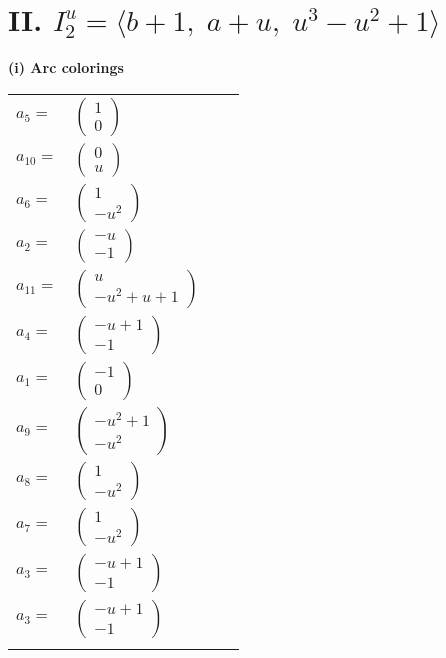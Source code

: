\documentclass[1p]{elsarticle_modified}
\theoremstyle{definition}
\begin{document}
\centering \section*{II. $I^u_{2}= \langle b+1,\;a+u,\;u^3- u^2+1 \rangle$}
\flushleft \textbf{(i) Arc colorings}\\
\begin{tabular}{m{7pt} m{180pt} m{7pt} m{180pt} }
\flushright $a_{5}=$&$\begin{pmatrix}1\\0\end{pmatrix}$ \\
\flushright $a_{10}=$&$\begin{pmatrix}0\\u\end{pmatrix}$ \\
\flushright $a_{6}=$&$\begin{pmatrix}1\\- u^2\end{pmatrix}$ \\
\flushright $a_{2}=$&$\begin{pmatrix}- u\\-1\end{pmatrix}$ \\
\flushright $a_{11}=$&$\begin{pmatrix}u\\- u^2+u+1\end{pmatrix}$ \\
\flushright $a_{4}=$&$\begin{pmatrix}- u+1\\-1\end{pmatrix}$ \\
\flushright $a_{1}=$&$\begin{pmatrix}-1\\0\end{pmatrix}$ \\
\flushright $a_{9}=$&$\begin{pmatrix}- u^2+1\\- u^2\end{pmatrix}$ \\
\flushright $a_{8}=$&$\begin{pmatrix}1\\- u^2\end{pmatrix}$ \\
\flushright $a_{7}=$&$\begin{pmatrix}1\\- u^2\end{pmatrix}$ \\
\flushright $a_{3}=$&$\begin{pmatrix}- u+1\\-1\end{pmatrix}$\\ \flushright $a_{3}=$&$\begin{pmatrix}- u+1\\-1\end{pmatrix}$\\&\end{tabular}
\end{document}
